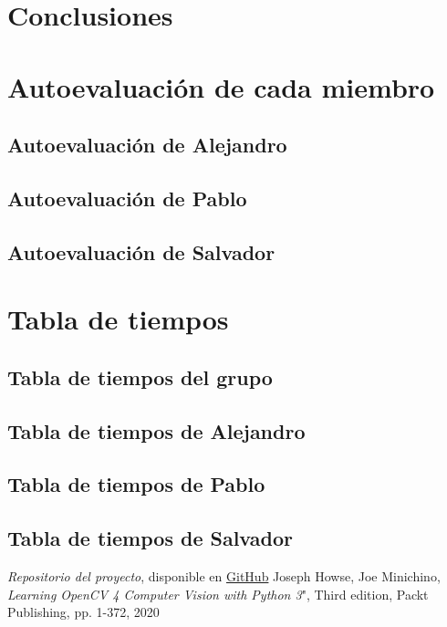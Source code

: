 \documentclass[a4paper]{article}
\begin{document}
\section{Conclusiones}

\section{Autoevaluación de cada miembro}

\subsection{Autoevaluación de Alejandro}

\subsection{Autoevaluación de Pablo}

\subsection{Autoevaluación de Salvador}

\section{Tabla de tiempos}

\subsection{Tabla de tiempos del grupo}

\subsection{Tabla de tiempos de Alejandro}

\subsection{Tabla de tiempos de Pablo}

\subsection{Tabla de tiempos de Salvador}

\begin{thebibliography}{99}
 \textit{Repositorio del proyecto}, disponible en \href{https://github.com/PacktPublishing/Learning-OpenCV-4-Computer-Vision-with-Python-Third-Edition}{GitHub}
 Joseph Howse, Joe Minichino, \textit{Learning OpenCV 4 Computer Vision with Python 3}", Third edition, Packt Publishing, pp. 1-372, 2020
\end{thebibliography}
\end{document}

